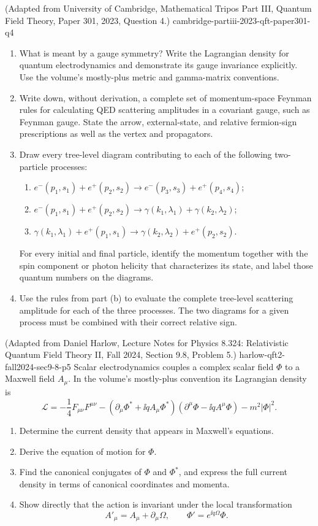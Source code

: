 \begin{enumerate}
  {(Adapted from University of Cambridge, Mathematical Tripos Part III, Quantum Field Theory, Paper 301, 2023, Question 4.)}
  {cambridge-partiii-2023-qft-paper301-q4}
\begin{enumerate}
\item
What is meant by a gauge symmetry?  Write the Lagrangian density for quantum
electrodynamics and demonstrate its gauge invariance explicitly.  Use the
volume's mostly-plus metric and gamma-matrix conventions.
\item
Write down, without derivation, a complete set of momentum-space Feynman
rules for calculating QED scattering amplitudes in a covariant gauge, such
as Feynman gauge.  State the arrow, external-state, and relative
fermion-sign prescriptions as well as the vertex and propagators.
\item
Draw every tree-level diagram contributing to each of the following
two-particle processes:
\begin{enumerate}
\item
\(e^-(p_1,s_1)+e^+(p_2,s_2)\to
e^-(p_3,s_3)+e^+(p_4,s_4)\);
\item
\(e^-(p_1,s_1)+e^+(p_2,s_2)\to
\gamma(k_1,\lambda_1)+\gamma(k_2,\lambda_2)\);
\item
\(\gamma(k_1,\lambda_1)+e^+(p_1,s_1)\to
\gamma(k_2,\lambda_2)+e^+(p_2,s_2)\).
\end{enumerate}
For every initial and final particle, identify the momentum together with
the spin component or photon helicity that characterizes its state, and
label those quantum numbers on the diagrams.
\item
Use the rules from part (b) to evaluate the complete tree-level scattering
amplitude for each of the three processes.  The two diagrams for a given
process must be combined with their correct relative sign.
\end{enumerate}

  {(Adapted from Daniel Harlow, Lecture Notes for Physics 8.324: Relativistic Quantum Field Theory II, Fall 2024, Section 9.8, Problem 5.)}
  {harlow-qft2-fall2024-sec9-8-p5}
Scalar electrodynamics couples a complex scalar field \(\Phi\) to a Maxwell
field \(A_\mu\).  In the volume's mostly-plus convention its Lagrangian
density is
\[
 \mathcal L=
 -\frac14F_{\mu\nu}F^{\mu\nu}
 -(\partial_\mu\Phi^*+\ii qA_\mu\Phi^*)
  (\partial^\mu\Phi-\ii qA^\mu\Phi)
 -m^2|\Phi|^2 .
\]
\begin{enumerate}
\item
Determine the current density that appears in Maxwell's equations.
\item
Derive the equation of motion for \(\Phi\).
\item
Find the canonical conjugates of \(\Phi\) and \(\Phi^*\), and express the
full current density in terms of canonical coordinates and momenta.
\item
Show directly that the action is invariant under the local transformation
\[
 A'_\mu=A_\mu+\partial_\mu\Omega,
 \qquad
 \Phi'=e^{\ii q\Omega}\Phi .
\]
\end{enumerate}


\end{enumerate}
